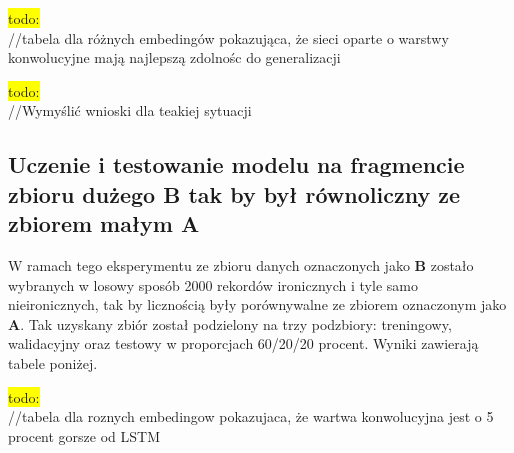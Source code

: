 \colorbox{yellow}{todo:}\\
//tabela dla różnych embedingów pokazująca, że sieci oparte o warstwy konwolucyjne mają najlepszą zdolnośc do generalizacji

\colorbox{yellow}{todo:}\\
//Wymyślić wnioski dla teakiej sytuacji


\subsection{Uczenie i testowanie modelu na fragmencie zbioru dużego B tak by był równoliczny ze zbiorem małym A}

W ramach tego eksperymentu ze zbioru danych oznaczonych jako \textbf{B} zostało wybranych w losowy sposób 2000 rekordów ironicznych i tyle samo nieironicznych, tak by licznością były porównywalne ze zbiorem oznaczonym jako \textbf{A}. Tak uzyskany zbiór został podzielony na trzy podzbiory: treningowy, walidacyjny oraz testowy w proporcjach 60/20/20 procent. Wyniki zawierają tabele poniżej.

\colorbox{yellow}{todo:}\\
//tabela dla roznych embedingow pokazujaca, że wartwa konwolucyjna jest o 5 procent gorsze od LSTM

